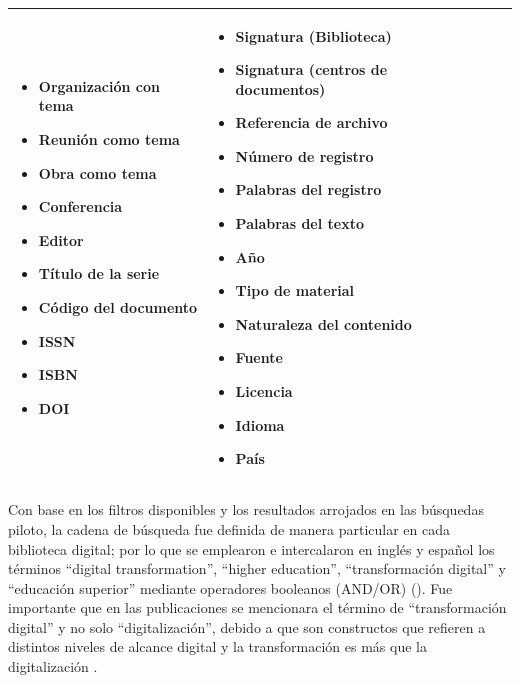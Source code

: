 \begin{table}[htpb]
\begin{threeparttable}
\begin{tabular}{
>{\raggedright\arraybackslash}p{}
>{\raggedright\arraybackslash}p{}
>{\raggedright\arraybackslash}p{}
>{\raggedright\arraybackslash}p{}}
\begin{itemize}[leftmargin=*, nosep]
            \item Organización con tema
            \item Reunión como tema
            \item Obra como tema
            \item Conferencia
            \item Editor
            \item Título de la serie
            \item Código del documento
            \item ISSN
            \item ISBN
            \item DOI
        \end{itemize}
     &
        \begin{itemize}[leftmargin=*, nosep]
            \item Signatura (Biblioteca)
            \item Signatura (centros de documentos)
            \item Referencia de archivo
            \item Número de registro
            \item Palabras del registro
            \item Palabras del texto
            \item Año
            \item Tipo de material
            \item Naturaleza del contenido
            \item Fuente
            \item Licencia
            \item Idioma
            \item País
        \end{itemize}
     \\ 
     \bottomrule
     \end{tabular}
     \end{threeparttable}
     \end{table}

Con base en los filtros disponibles y los resultados arrojados en las
búsquedas piloto, la cadena de búsqueda fue definida de manera
particular en cada biblioteca digital; por lo que se emplearon e
intercalaron en inglés y español los términos ``digital
transformation'', ``higher education'', ``transformación digital'' y
``educación superior'' mediante operadores booleanos (AND/OR) ().
Fue importante que en las publicaciones se mencionara el término de
``transformación digital'' y no solo ``digitalización'', debido a que
son constructos que refieren a distintos niveles de alcance digital y la
transformación es más que la digitalización \cite{grajek2020}.

